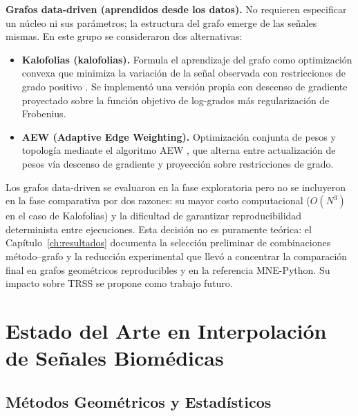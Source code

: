 \textbf{Grafos data-driven (aprendidos desde los datos).} No requieren especificar un núcleo ni sus parámetros; la estructura del grafo emerge de las señales mismas. En este grupo se consideraron dos alternativas:
\begin{itemize}[leftmargin=*,itemsep=1pt,topsep=2pt]
\item \textbf{Kalofolias (kalofolias).} Formula el aprendizaje del grafo como optimización convexa que minimiza la variación de la señal observada con restricciones de grado positivo \cite{kalofolias_how_2016}. Se implementó una versión propia con descenso de gradiente proyectado sobre la función objetivo de log-grados más regularización de Frobenius.
\item \textbf{AEW (Adaptive Edge Weighting).} Optimización conjunta de pesos y topología mediante el algoritmo AEW \cite{shekkizhar2020}, que alterna entre actualización de pesos vía descenso de gradiente y proyección sobre restricciones de grado.
\end{itemize}

Los grafos data-driven se evaluaron en la fase exploratoria pero no se incluyeron en la fase comparativa por dos razones: su mayor costo computacional ($O(N^3)$ en el caso de Kalofolias) y la dificultad de garantizar reproducibilidad determinista entre ejecuciones. Esta decisión no es puramente teórica: el Capítulo~\ref{ch:resultados} documenta la selección preliminar de combinaciones método--grafo y la reducción experimental que llevó a concentrar la comparación final en grafos geométricos reproducibles y en la referencia MNE-Python. Su impacto sobre TRSS se propone como trabajo futuro.

\section{Estado del Arte en Interpolación de Señales Biomédicas}

\subsection{Métodos Geométricos y Estadísticos}

